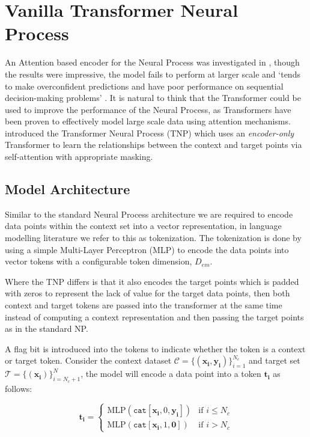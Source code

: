 \documentclass[../../main.tex]{subfiles}
\begin{document}
\section{Vanilla Transformer Neural Process}

An Attention based encoder for the Neural Process was investigated in \cite{kim2019attentive}, though the results were impressive, the model fails to perform at larger scale and `tends to make overconfident predictions and have poor performance on sequential decision-making problems' \cite{nguyen2023transformer}. It is natural to think that the Transformer \cite{vaswani2017attention} could be used to improve the performance of the Neural Process, as Transformers have been proven to effectively model large scale data using attention mechanisms. \cite{nguyen2023transformer} introduced the Transformer Neural Process (TNP) which uses an \emph{encoder-only} Transformer to learn the relationships between the context and target points via self-attention with appropriate masking. 

\subsection{Model Architecture}

Similar to the standard Neural Process architecture we are required to encode data points within the context set into a vector representation, in language modelling literature we refer to this as tokenization. The tokenization is done by using a simple Multi-Layer Perceptron (MLP) to encode the data points into vector tokens with a configurable token dimension, $D_{em}$.

Where the TNP differs is that it also encodes the target points which is padded with zeros to represent the lack of value for the target data points, then both context and target tokens are passed into the transformer at the same time instead of computing a context representation and then passing the target points as in the standard NP.

A flag bit is introduced into the tokens to indicate whether the token is a context or target token. Consider the context dataset $\mathcal{C} = \{(\bm{x_i}, \bm{y_i})\}_{i=1}^{N_c}$ and target set $\mathcal{T} = \{(\bm{x_i})\}_{i=N_c+1}^{N}$, the model will encode a data point into a token $\bm{t_i}$ as follows:

\[
	\bm{t_i} = \begin{cases}
		\text{MLP}(\texttt{cat}[\bm{x_i},  0, \bm{y_i}]) & \text{if } i \leq N_c \\
		\text{MLP}(\texttt{cat}[\bm{x_i},  1, \bm{ 0}]) & \text{if } i > N_c
	\end{cases}
\]
\end{document}

